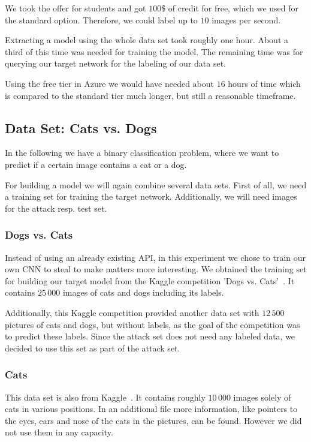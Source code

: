 \documentclass[a4paper,11pt]{article}
\begin{document}
        We took the offer for students and got $100$\$ of credit for free, which we used for the standard option. Therefore, we could label up to $10$ images per second. 
        
        Extracting a model using the whole data set took roughly one hour. About a third of this time was needed for training the model. The remaining time was for querying our target network for the labeling of our data set. 
        
        Using the free tier in Azure we would have needed about $16$ hours of time which is compared to the standard tier much longer, but still a reasonable timeframe. 

    \subsection{Data Set: Cats vs. Dogs}
        In the following we have a binary classification problem, where we want to predict if a certain image contains a cat or a dog. 
        
        For building a model we will again combine several data sets. First of all, we need a training set for training the target network. Additionally, we will need images for the attack resp. test set. 
        
        \subsubsection{Dogs vs. Cats}
            Instead of using an already existing API, in this experiment we chose to train our own CNN to steal to make matters more interesting. We obtained the training set for building our target model from the Kaggle competition 'Dogs vs. Cats'~\cite{dogs-cats}. It contains $25\,000$ images of cats and dogs including its labels.
            
            Additionally, this Kaggle competition provided another data set with $12\,500$ pictures of cats and dogs, but without labels, as the goal of the competition was to predict these labels. Since the attack set does not need any labeled data, we decided to use this set as part of the attack set.
            
        \subsubsection{Cats}
            This data set is also from Kaggle~\cite{cats}. It contains roughly $10\,000$ images solely of cats in various positions. 
            In an additional file more information, like pointers to the eyes, ears and nose of the cats in the pictures, can be found. However we did not use them in any capacity. 
            
\end{document}
